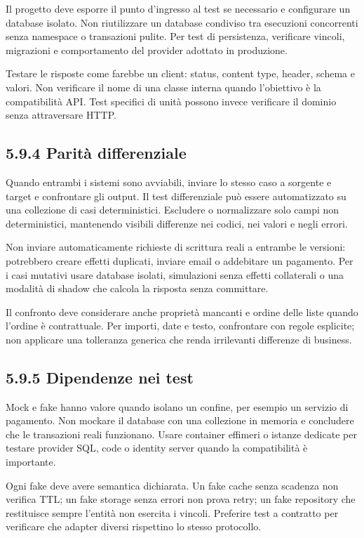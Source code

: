 \documentclass[
  italian,
  10pt,
]{book}
\begin{document}
Il progetto deve esporre il punto d'ingresso al test se necessario e
configurare un database isolato. Non riutilizzare un database condiviso
tra esecuzioni concorrenti senza namespace o transazioni pulite. Per
test di persistenza, verificare vincoli, migrazioni e comportamento del
provider adottato in produzione.

Testare le risposte come farebbe un client: status, content type,
header, schema e valori. Non verificare il nome di una classe interna
quando l'obiettivo è la compatibilità API. Test specifici di unità
possono invece verificare il dominio senza attraversare HTTP.

\subsection{5.9.4 Parità differenziale}\label{parituxe0-differenziale}

Quando entrambi i sistemi sono avviabili, inviare lo stesso caso a
sorgente e target e confrontare gli output. Il test differenziale può
essere automatizzato su una collezione di casi deterministici. Escludere
o normalizzare solo campi non deterministici, mantenendo visibili
differenze nei codici, nei valori e negli errori.

Non inviare automaticamente richieste di scrittura reali a entrambe le
versioni: potrebbero creare effetti duplicati, inviare email o
addebitare un pagamento. Per i casi mutativi usare database isolati,
simulazioni senza effetti collaterali o una modalità di shadow che
calcola la risposta senza committare.

Il confronto deve considerare anche proprietà mancanti e ordine delle
liste quando l'ordine è contrattuale. Per importi, date e testo,
confrontare con regole esplicite; non applicare una tolleranza generica
che renda irrilevanti differenze di business.

\subsection{5.9.5 Dipendenze nei test}\label{dipendenze-nei-test}

Mock e fake hanno valore quando isolano un confine, per esempio un
servizio di pagamento. Non mockare il database con una collezione in
memoria e concludere che le transazioni reali funzionano. Usare
container effimeri o istanze dedicate per testare provider SQL, code o
identity server quando la compatibilità è importante.

Ogni fake deve avere semantica dichiarata. Un fake cache senza scadenza
non verifica TTL; un fake storage senza errori non prova retry; un fake
repository che restituisce sempre l'entità non esercita i vincoli.
Preferire test a contratto per verificare che adapter diversi rispettino
lo stesso protocollo.
\end{document}
